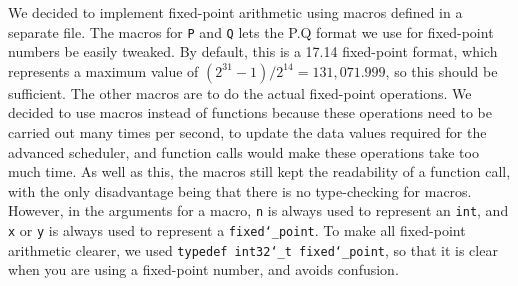 \documentclass{article}
\renewcommand{\_}{\char`_}
\begin{document}
We decided to implement fixed-point arithmetic using macros defined in a separate file. The macros for \texttt{P} and \texttt{Q} lets the P.Q format we use for fixed-point numbers be easily tweaked. By default, this is a 17.14 fixed-point format, which represents a maximum value of $(2^{31} - 1)/2^{14} = 131,071.999$, so this should be sufficient. The other macros are to do the actual fixed-point operations. We decided to use macros instead of functions because these operations need to be carried out many times per second, to update the data values required for the advanced scheduler, and function calls would make these operations take too much time. As well as this, the macros still kept the readability of a function call, with the only disadvantage being that there is no type-checking for macros. However, in the arguments for a macro, \texttt{n} is always used to represent an \texttt{int}, and \texttt{x} or \texttt{y} is always used to represent a \texttt{fixed\_point}. To make all fixed-point arithmetic clearer, we used \texttt{typedef int32\_t fixed\_point}, so that it is clear when you are using a fixed-point number, and avoids confusion.


\end{document}
